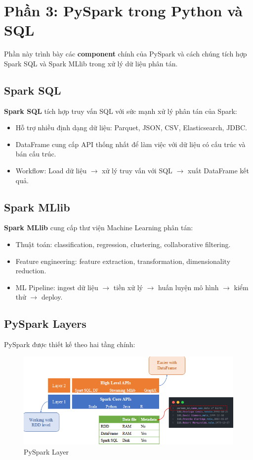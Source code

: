 \documentclass[11pt]{article}
\begin{document}
\section{Phần 3: PySpark trong Python và SQL}
Phần này trình bày các \textbf{component} chính của PySpark và cách chúng tích hợp Spark SQL và Spark MLlib trong xử lý dữ liệu phân tán.

\subsection{Spark SQL}
\textbf{Spark SQL} tích hợp truy vấn SQL với sức mạnh xử lý phân tán của Spark:
\begin{itemize}
    \item Hỗ trợ nhiều định dạng dữ liệu: Parquet, JSON, CSV, Elasticsearch, JDBC.
    \item DataFrame cung cấp API thống nhất để làm việc với dữ liệu có cấu trúc và bán cấu trúc.
    \item Workflow: Load dữ liệu $\rightarrow$ xử lý truy vấn với SQL $\rightarrow$ xuất DataFrame kết quả.
\end{itemize}

\subsection{Spark MLlib}
\textbf{Spark MLlib} cung cấp thư viện Machine Learning phân tán:
\begin{itemize}
    \item Thuật toán: classification, regression, clustering, collaborative filtering.
    \item Feature engineering: feature extraction, transformation, dimensionality reduction.
    \item ML Pipeline: ingest dữ liệu $\rightarrow$ tiền xử lý $\rightarrow$ huấn luyện mô hình $\rightarrow$ kiểm thử $\rightarrow$ deploy.
\end{itemize}

\subsection{PySpark Layers}
PySpark được thiết kế theo hai tầng chính:
\begin{figure}[H]
    \centering
    \includegraphics[width=0.65\linewidth]{pysparkLayer.png}
    \caption{PySpark Layer}
    \label{fig:pyspark_layer}
\end{figure}
\end{document}
